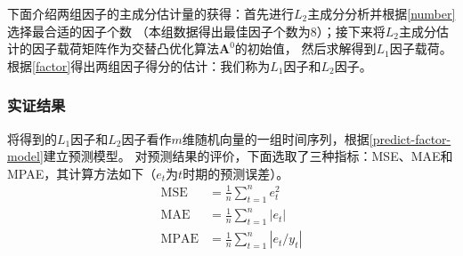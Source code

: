 下面介绍两组因子的主成分估计量的获得：首先进行$L_2$主成分分析并根据\eqref{number}选择最合适的因子个数
（本组数据得出最佳因子个数为8）；接下来将$L_2$主成分估计的因子载荷矩阵作为交替凸优化算法$\bm{A}^0$的初始值，
然后求解得到$L_1$因子载荷。根据\eqref{factor}得出两组因子得分的估计：我们称为$L_1$因子和$L_2$因子。

\subsubsection{实证结果}

将得到的$L_1$因子和$L_2$因子看作$m$维随机向量的一组时间序列，根据\eqref{predict-factor-model}建立预测模型。
对预测结果的评价，下面选取了三种指标：MSE、MAE和MPAE，其计算方法如下（$e_t$为$t$时期的预测误差）。
\begin{equation}
    \begin{array}{clr}
        \text{MSE} &= \frac{1}{n}\sum_{t=1}^n e_t^2 \\
        \text{MAE} &= \frac{1}{n}\sum_{t=1}^n |e_t| \\
        \text{MPAE} &= \frac{1}{n}\sum_{t=1}^n |e_t / y_t| \\
    \end{array}
\end{equation}

